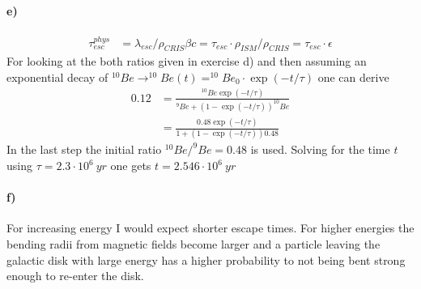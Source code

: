 \documentclass[10pt,a4paper]{article}
\begin{document}
\paragraph{e)}
\begin{align*}
\tau_{esc}^{phys} &= \lambda_{esc}/\rho_{CRIS} \beta c = \tau_{esc} \cdot \rho_{ISM} / \rho_{CRIS} = \tau_{esc} \cdot \epsilon
\end{align*}
For looking at the both ratios given in exercise d) and then assuming an exponential decay of $^{10}Be \rightarrow ^{10}Be(t) = ^{10}Be_0 \cdot \exp(-t/\tau)$ one can derive
\begin{align*}
0.12 &= \frac{^{10}Be \exp(-t/\tau)}{^{9}Be + (1 - \exp(-t/\tau)) ^{10}Be} \\
&= \frac{0.48 \exp(-t/\tau)}{1 + (1 - \exp(-t/\tau)) 0.48}
\end{align*}
In the last step the initial ratio $^{10}Be/^{9}Be=0.48$ is used. 
Solving for the time $t$ using $\tau=2.3 \cdot 10^6\ yr$ one gets $t=2.546 \cdot 10^6\ yr$
\paragraph{f)}
For increasing energy I would expect shorter escape times. For higher energies the bending radii from magnetic fields become larger and a particle leaving the galactic disk with large energy has a higher probability to not being bent strong enough to re-enter the disk.
\end{document}
